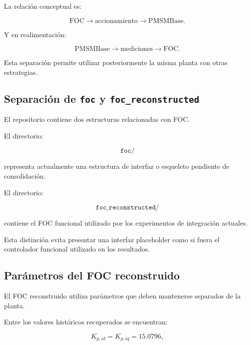La relación conceptual es:

\begin{equation}
\text{FOC}
\rightarrow
\text{accionamiento}
\rightarrow
\text{PMSMBase}.
\end{equation}

Y en realimentación:

\begin{equation}
\text{PMSMBase}
\rightarrow
\text{mediciones}
\rightarrow
\text{FOC}.
\end{equation}

Esta separación permite utilizar posteriormente la misma planta con otras estrategias.

\subsection{Separación de \texttt{foc} y \texttt{foc\_reconstructed}}

El repositorio contiene dos estructuras relacionadas con FOC.

El directorio:

\begin{equation}
\texttt{foc/}
\end{equation}

representa actualmente una estructura de interfaz o esqueleto pendiente de consolidación.

El directorio:

\begin{equation}
\texttt{foc\_reconstructed/}
\end{equation}

contiene el FOC funcional utilizado por los experimentos de integración actuales.

Esta distinción evita presentar una interfaz placeholder como si fuera el controlador funcional utilizado en los resultados.

\subsection{Parámetros del FOC reconstruido}

El FOC reconstruido utiliza parámetros que deben mantenerse separados de la planta.

Entre los valores históricos recuperados se encuentran:

\begin{equation}
K_{p,id}=K_{p,iq}=15.0796,
\end{equation}

